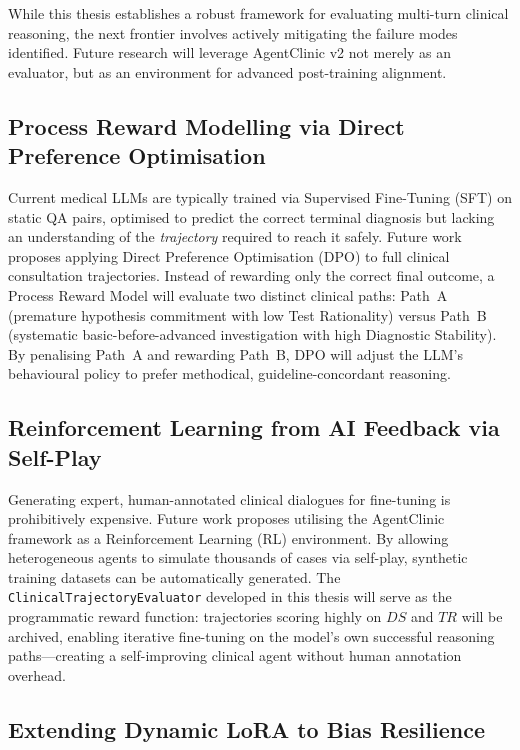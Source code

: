 While this thesis establishes a robust framework for evaluating multi-turn clinical reasoning, the next frontier involves actively mitigating the failure modes identified. Future research will leverage AgentClinic v2 not merely as an evaluator, but as an environment for advanced post-training alignment.

\subsection{Process Reward Modelling via Direct Preference Optimisation}

Current medical LLMs are typically trained via Supervised Fine-Tuning (SFT) on static QA pairs, optimised to predict the correct terminal diagnosis but lacking an understanding of the \textit{trajectory} required to reach it safely. Future work proposes applying Direct Preference Optimisation (DPO) to full clinical consultation trajectories. Instead of rewarding only the correct final outcome, a Process Reward Model will evaluate two distinct clinical paths: Path~A (premature hypothesis commitment with low Test Rationality) versus Path~B (systematic basic-before-advanced investigation with high Diagnostic Stability). By penalising Path~A and rewarding Path~B, DPO will adjust the LLM's behavioural policy to prefer methodical, guideline-concordant reasoning.

\subsection{Reinforcement Learning from AI Feedback via Self-Play}

Generating expert, human-annotated clinical dialogues for fine-tuning is prohibitively expensive. Future work proposes utilising the AgentClinic framework as a Reinforcement Learning (RL) environment. By allowing heterogeneous agents to simulate thousands of cases via self-play, synthetic training datasets can be automatically generated. The \texttt{ClinicalTrajectoryEvaluator} developed in this thesis will serve as the programmatic reward function: trajectories scoring highly on $DS$ and $TR$ will be archived, enabling iterative fine-tuning on the model's own successful reasoning paths---creating a self-improving clinical agent without human annotation overhead.

\subsection{Extending Dynamic LoRA to Bias Resilience}

